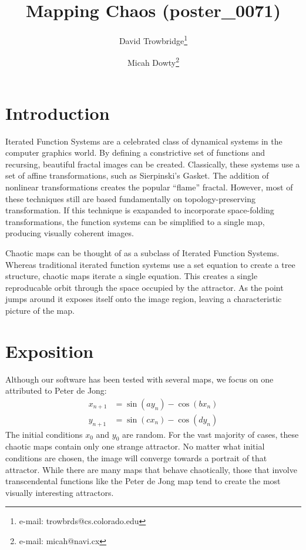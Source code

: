 \documentclass{acmsiggraph}
\title{Mapping Chaos (poster\_0071)}
\author{
  David Trowbridge\thanks{e-mail: trowbrds@cs.colorado.edu}
\and
  Micah Dowty\thanks{e-mail: micah@navi.cx}
}
\begin{document}
\maketitle

\section{Introduction}
\copyrightspace
Iterated Function Systems are a celebrated class of dynamical systems in the
computer graphics world. By defining a constrictive set of functions and
recursing, beautiful fractal images can be created. Classically, these
systems use a set of affine transformations, such as Sierpinski's Gasket.
The addition of nonlinear transformations creates the popular ``flame''
fractal. However, most of these techniques still are based fundamentally
on topology-preserving transformation. If this technique is exapanded to
incorporate space-folding transformations, the function systems can be
simplified to a single map, producing visually coherent images.

Chaotic maps can be thought of as a subclass of Iterated Function Systems.
Whereas traditional iterated function systems use a set equation to create
a tree structure, chaotic maps iterate a single equation. This creates a
single reproducable orbit through the space occupied by the attractor. As
the point jumps around it exposes itself onto the image region, leaving
a characteristic picture of the map.

\section{Exposition}
Although our software has been tested with several maps, we focus on one
attributed to Peter de Jong:
\begin{eqnarray*}
  x_{n+1} &= \sin (a y_n) - \cos (b x_n) \\
  y_{n+1} &= \sin (c x_n) - \cos (d y_n)
\end{eqnarray*}
The initial conditions $x_0$ and $y_0$ are random. For the vast majority
of cases, these chaotic maps contain only one strange attractor. No matter
what initial conditions are chosen, the image will converge towards a
portrait of that attractor. While there are many maps that behave
chaotically, those that involve transcendental functions like the Peter
de Jong map tend to create the most visually interesting attractors.
\end{document}
